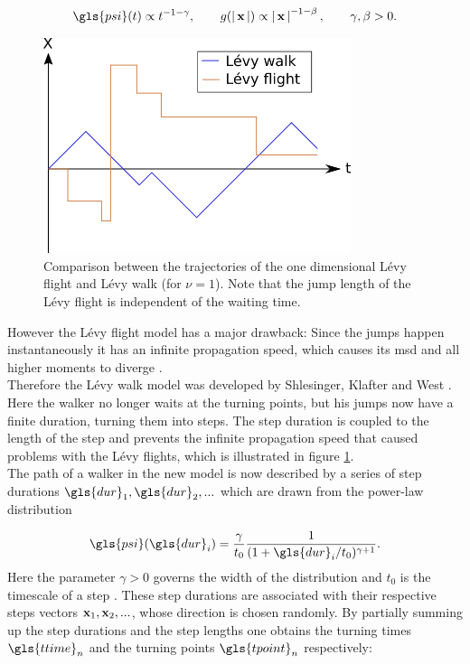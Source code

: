 \begin{align}
\gls{psi}(t) \propto t^{-1-\gamma}, \qquad g(\abs{\ve{x}}) \propto \abs{\ve{x}}^{-1-\beta}, \qquad \gamma, \beta > 0.
\end{align} 
%
\begin{figure}
\begin{center}
\includegraphics[width=90mm]{pics/levyFlight.png}
\caption{Comparison between the trajectories of the one dimensional L\'evy flight and L\'evy walk (for $\nu=1$). Note that the jump length of the L\'evy flight is independent of the waiting time. 
\label{fig:levyFlight}}
\end{center}
\end{figure}
%
However the L\'evy flight model has a major drawback: Since the jumps happen instantaneously it has an infinite propagation speed, which causes its \gls{msd} and all higher moments to diverge \cite{lwreview}. \\


Therefore the L\'evy walk model was developed by Shlesinger, Klafter and West \cite{shlesinger1987}. Here the walker no longer waits at the turning points, but his jumps now have a finite duration, turning them into steps. The step duration is coupled to the length of the step and prevents the infinite propagation speed that caused problems with the L\'evy flights, which is illustrated in figure \ref{fig:levyFlight}. \\

The path of a walker in the new model is now described by a series of step durations $\gls{dur}_1, \gls{dur}_2, ...$ which are drawn from the power-law distribution 

\begin{align}
\gls{psi}(\gls{dur}_i) = \frac{\gamma}{t_0} \frac{1}{(1+\gls{dur}_i/t_0)^{\gamma+1}} .
\label{eqn:defPsi}
\end{align}
%
Here the parameter $\gamma>0$ governs the width of the distribution and { \color{red}$t_0$ is the timescale of a step }. These step durations are associated with their respective steps vectors $\mathbf{ x }_1, \mathbf{ x }_2, ...$, whose direction is chosen randomly. By partially summing up the step durations and the step lengths one obtains the turning times $\gls{ttime}_n$ and the turning points $\gls{tpoint}_n$ respectively:

